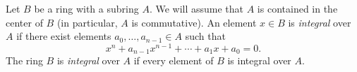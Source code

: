 \documentclass{article}
\begin{document}
Let $B$ be a ring with a subring $A$. We will assume that $A$ is contained in the center of $B$ (in particular, $A$ is commutative). An element $x \in B$ is \emph{integral} over $A$ if there exist elements $a_0, \dots, a_{n-1} \in A$ such that
$$
x^n + a_{n-1} x^{n-1} + \cdots + a_1 x + a_0 = 0.
$$
The ring $B$ is \emph{integral} over $A$ if every element of $B$ is integral over $A$.
\end{document}
